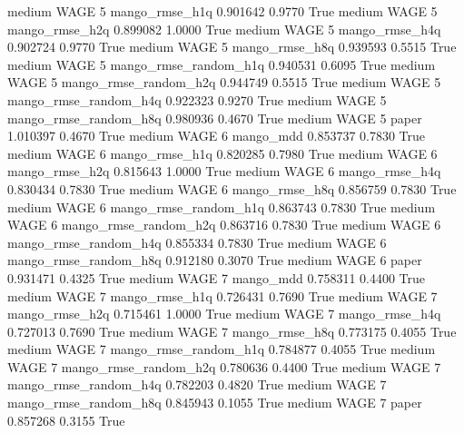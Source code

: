     medium     WAGE                 5        mango_rmse_h1q   0.901642      0.9770    True
    medium     WAGE                 5        mango_rmse_h2q   0.899082      1.0000    True
    medium     WAGE                 5        mango_rmse_h4q   0.902724      0.9770    True
    medium     WAGE                 5        mango_rmse_h8q   0.939593      0.5515    True
    medium     WAGE                 5 mango_rmse_random_h1q   0.940531      0.6095    True
    medium     WAGE                 5 mango_rmse_random_h2q   0.944749      0.5515    True
    medium     WAGE                 5 mango_rmse_random_h4q   0.922323      0.9270    True
    medium     WAGE                 5 mango_rmse_random_h8q   0.980936      0.4670    True
    medium     WAGE                 5                 paper   1.010397      0.4670    True
    medium     WAGE                 6             mango_mdd   0.853737      0.7830    True
    medium     WAGE                 6        mango_rmse_h1q   0.820285      0.7980    True
    medium     WAGE                 6        mango_rmse_h2q   0.815643      1.0000    True
    medium     WAGE                 6        mango_rmse_h4q   0.830434      0.7830    True
    medium     WAGE                 6        mango_rmse_h8q   0.856759      0.7830    True
    medium     WAGE                 6 mango_rmse_random_h1q   0.863743      0.7830    True
    medium     WAGE                 6 mango_rmse_random_h2q   0.863716      0.7830    True
    medium     WAGE                 6 mango_rmse_random_h4q   0.855334      0.7830    True
    medium     WAGE                 6 mango_rmse_random_h8q   0.912180      0.3070    True
    medium     WAGE                 6                 paper   0.931471      0.4325    True
    medium     WAGE                 7             mango_mdd   0.758311      0.4400    True
    medium     WAGE                 7        mango_rmse_h1q   0.726431      0.7690    True
    medium     WAGE                 7        mango_rmse_h2q   0.715461      1.0000    True
    medium     WAGE                 7        mango_rmse_h4q   0.727013      0.7690    True
    medium     WAGE                 7        mango_rmse_h8q   0.773175      0.4055    True
    medium     WAGE                 7 mango_rmse_random_h1q   0.784877      0.4055    True
    medium     WAGE                 7 mango_rmse_random_h2q   0.780636      0.4400    True
    medium     WAGE                 7 mango_rmse_random_h4q   0.782203      0.4820    True
    medium     WAGE                 7 mango_rmse_random_h8q   0.845943      0.1055    True
    medium     WAGE                 7                 paper   0.857268      0.3155    True
